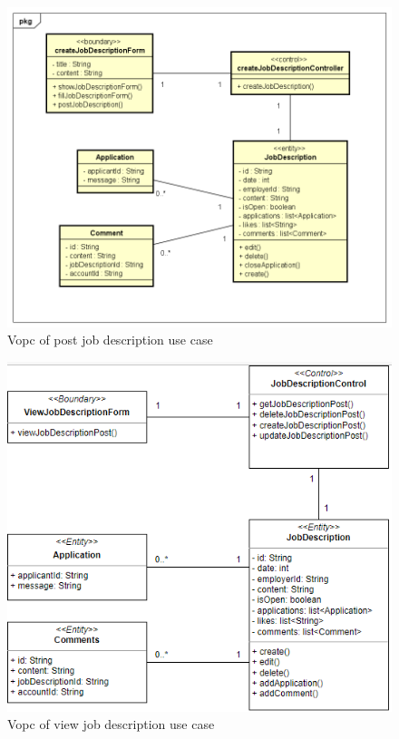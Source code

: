 \documentclass[a4paper]{article}
\begin{document}
    \begin{figure}[H]
        \centering
        \includegraphics[width=1.0\textwidth]{vopc_post_jd.png}
        \caption{Vopc of post job description use case}
        \label{fig:fig26}
    \end{figure}

    \begin{figure}[H]
        \centering
        \includegraphics[width=1.0\textwidth]{vopc_view_jd.png}
        \caption{Vopc of view job description use case}
        \label{fig:fig27}
    \end{figure}
\end{document}

